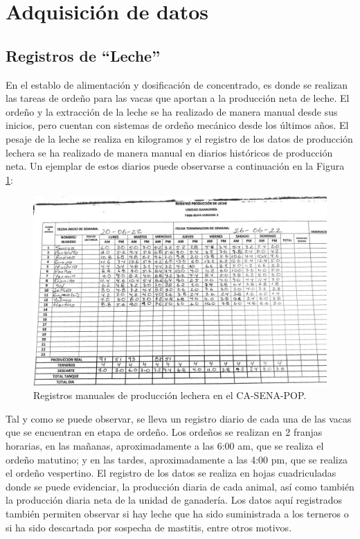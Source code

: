 
\section{Adquisición de datos}
\subsection{Registros de ``Leche''}
En el establo de alimentación y dosificación de concentrado, es donde se realizan las tareas de ordeño para las vacas que aportan a la producción neta de leche. El ordeño y la extracción de la leche se ha realizado de manera manual desde sus inicios, pero cuentan con sistemas de ordeño mecánico desde los últimos años. El pesaje de la leche se realiza en kilogramos y el registro de los datos de producción lechera se ha realizado de manera manual en diarios históricos de producción neta. Un ejemplar de estos diarios puede observarse a continuación en la Figura \ref{regleche1png}:

\begin{figure}[H]
	 \begin{center}
	 \includegraphics[scale=0.515]{img/regleche1.jpg}
	 \end{center}
	 \caption{Registros manuales de producción lechera en el CA-SENA-POP. \label{regleche1png}}
	\end{figure}
	
Tal y como se puede observar, se lleva un registro diario de cada una de las vacas que se encuentran en etapa de ordeño. Los ordeños se realizan en 2 franjas horarias, en las mañanas, aproximadamente a las 6:00 am, que se realiza el ordeño matutino; y en las tardes, aproximadamente a las 4:00 pm, que se realiza el ordeño vespertino. El registro de los datos se realiza en hojas cuadriculadas donde se puede evidenciar, la producción diaria de cada animal, así como también la producción diaria neta de la unidad de ganadería. Los datos aquí registrados también permiten observar si hay leche que ha sido suministrada a los terneros o si ha sido descartada por sospecha de mastitis, entre otros motivos. \\
	
